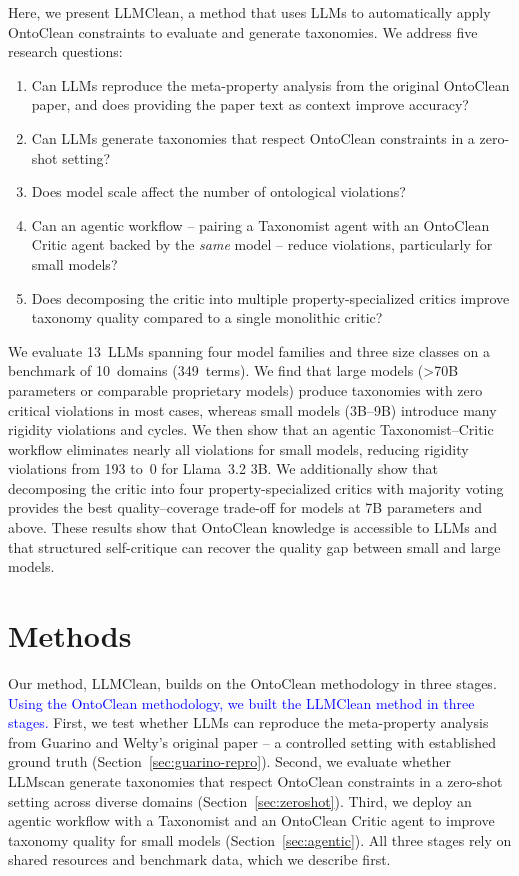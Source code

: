 \documentclass{IOS-Book-Article}
\begin{document}
Here, we present LLMClean, a method that uses LLMs to automatically
apply OntoClean constraints to evaluate and generate taxonomies.  We
address five research questions:

\begin{enumerate}
\item Can LLMs reproduce the meta-property analysis from the original
  OntoClean paper, and does providing the paper text as context improve
  accuracy?
\item Can LLMs generate taxonomies that respect OntoClean constraints
  in a zero-shot setting?
\item Does model scale affect the number of ontological violations?
\item Can an agentic workflow -- pairing a Taxonomist agent with an
  OntoClean Critic agent backed by the \emph{same} model -- reduce
  violations, particularly for small models?
\item Does decomposing the critic into multiple property-specialized
  critics improve taxonomy quality compared to a single monolithic
  critic?
\end{enumerate}

We evaluate 13~LLMs spanning four model families and three size
classes on a benchmark of 10~domains (349~terms).  We find that large
models (\textgreater 70B parameters or comparable proprietary models)
produce taxonomies with zero critical violations in most cases, whereas
small models (3B--9B) introduce many rigidity violations and cycles.
We then show that an agentic Taxonomist--Critic workflow eliminates
nearly all violations for small models, reducing rigidity violations
from 193 to~0 for Llama~3.2 3B.  We additionally show that
decomposing the critic into four property-specialized critics with
majority voting provides the best quality--coverage trade-off for
models at 7B parameters and above.  These results show that OntoClean
knowledge is accessible to LLMs and that structured self-critique can
recover the quality gap between small and large models.

\section{Methods}


Our method, LLMClean, builds on the OntoClean methodology in three
stages.  \textcolor{blue}{Using the OntoClean methodology, we built the LLMClean method in three stages.} First, we test whether LLMs can reproduce the meta-property analysis from Guarino and Welty's original paper -- a controlled setting with established ground truth (Section~\ref{sec:guarino-repro}).  Second, we evaluate whether LLMscan generate taxonomies that respect OntoClean constraints in a zero-shot setting across diverse domains (Section~\ref{sec:zeroshot}).  Third, we deploy an agentic workflow with a Taxonomist and an OntoClean Critic agent to improve taxonomy quality for small models (Section~\ref{sec:agentic}).  All three stages rely on shared resources and benchmark data, which we describe first.
\end{document}
